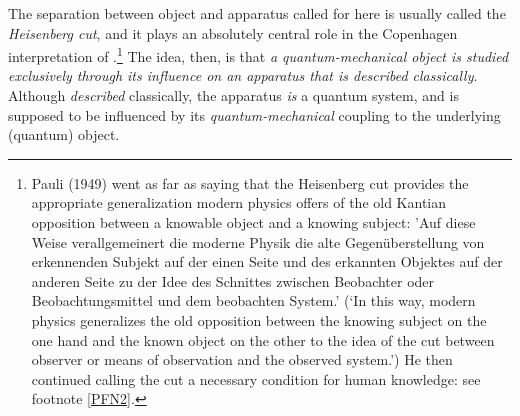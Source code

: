 \documentclass[12pt,titlepage]{article}
\begin{document}
The separation between object and apparatus called for here is
usually called the \textit{Heisenberg cut}, and it  plays an absolutely central role in the Copenhagen interpretation of \qm.\footnote{Pauli (1949) went  as far as saying that the Heisenberg cut provides the appropriate generalization modern physics offers of the old Kantian opposition between a knowable object and a knowing subject: 'Auf diese Weise verallgemeinert die moderne Physik die alte Gegen\"{u}berstellung von erkennenden Subjekt auf der einen Seite und des erkannten Objektes auf der anderen Seite zu der Idee des Schnittes zwischen Beobachter oder Beobachtungsmittel und dem beobachten System.'
(`In this way, modern physics generalizes the old opposition between the knowing subject on the one hand and the known object on the other to the idea
of the cut between observer or means of observation and the observed system.')  He then continued  calling the cut a necessary condition for human knowledge: see footnote \ref{PFN2}. } 
The idea, then, is that {\it a quantum-mechanical object is studied exclusively through its influence on an apparatus that is described classically}. Although {\it described} classically, the apparatus {\it is} a quantum system, and is supposed to be  influenced by its {\it quantum-mechanical} coupling to the underlying (quantum) object.
\end{document}

